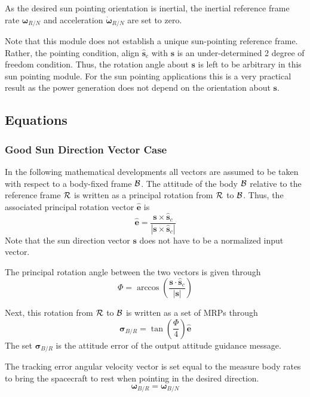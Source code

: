 As the desired sun pointing orientation is inertial, the inertial reference frame rate $\bm\omega_{R/N}$ and acceleration $\dot{\bm\omega}_{R/N}$ are set to zero. 

Note that this module does not establish a unique sun-pointing reference frame.  Rather, the pointing condition, align $\hat{\bm s}_{c}$ with $\bm s$ is an under-determined 2 degree of freedom condition.  Thus, the rotation angle about $\bm s$ is left to be arbitrary in this sun pointing module.  For the sun pointing applications this is a very practical result as the power generation does not depend on the orientation about $\bm s$.  



\subsection{Equations}
\subsubsection{Good Sun Direction Vector Case}
In the following mathematical developments all vectors are assumed to be taken with respect to a body-fixed frame $\cal B$.  The attitude of the body $\cal B$ relative to the reference frame $\cal R$ is written as a principal rotation from $\cal R$ to $\cal B$.  Thus, the associated principal rotation vector $\hat{\bm e}$ is
\begin{equation}
	\label{eq:ssp:1}
	\hat{\bm e} = \frac{\bm s \times \hat{\bm s}_{c}}{|\bm s \times \hat{\bm s}_{c}|}
\end{equation}
Note that the sun direction vector $\bm s$ does not have to be a normalized input vector.  

The principal rotation angle between the two vectors is given through
\begin{equation}
	\label{eq:ssp:2}
	\Phi = \arccos \left( \frac{\bm s  \cdot \hat{\bm s}_{c} }{|\bm s|} \right)
\end{equation}

Next, this rotation from $\cal R$ to $\cal B$ is written as a set of MRPs through
\begin{equation}
	\label{eq:ssp:3}
	\bm\sigma_{B/R} = \tan\left(\frac{\Phi}{4}\right) \hat{\bm e}
\end{equation}
The set $\bm\sigma_{B/R}$ is the attitude error of the output attitude guidance message.  


The tracking error angular velocity vector is set equal to the measure body rates to bring the spacecraft to rest when pointing in the desired direction.
\begin{equation}
	\label{eq:ssp:4}
	\bm\omega_{B/R} = \bm\omega_{B/N}
\end{equation}

